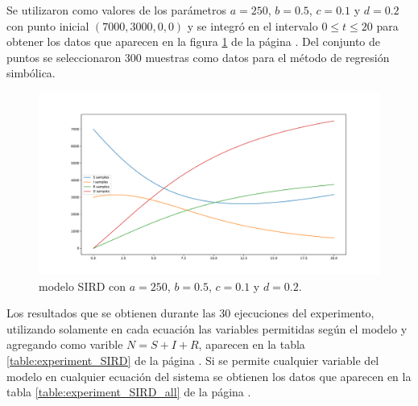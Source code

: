 Se utilizaron como valores de los parámetros $a = 250$, $b = 0.5$, $c = 0.1$ y $d = 0.2$ con punto inicial $(7000, 3000, 0, 0)$ y se integró en el intervalo $0 \leq t \leq 20$ para obtener los datos que aparecen en la figura \ref{fig:SIRD} de la página \pageref{fig:SIRD}. Del conjunto de puntos se seleccionaron 300 muestras como datos para el método de regresión simbólica.

\begin{figure}[h]
    \centering
    \includegraphics[width=\textwidth]{"figures/SIRD.pdf"}
    \caption{modelo SIRD con $a = 250$, $b = 0.5$, $c = 0.1$ y $d = 0.2$.}
    \label{fig:SIRD}
\end{figure}

Los resultados que se obtienen durante las 30 ejecuciones del experimento, utilizando solamente en cada ecuación las variables permitidas según el modelo y agregando como varible $N=S + I + R$, aparecen en la tabla \ref{table:experiment_SIRD} de la página \pageref{table:experiment_SIRD}. Si se permite cualquier variable del modelo en cualquier ecuación del sistema se obtienen los datos que aparecen en la tabla \ref{table:experiment_SIRD_all} de la página \pageref{table:experiment_SIRD_all}.


